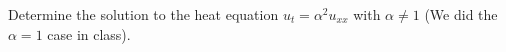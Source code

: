 \item Determine the solution to the heat equation $u_t = \alpha^2 u_{xx}$ with $\alpha \neq 1$ (We did the $\alpha = 1$ case in class).
\bigbreak
